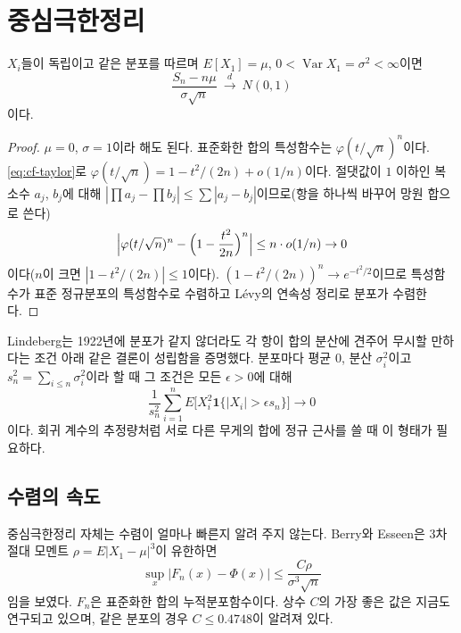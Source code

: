 \section{중심극한정리}
\label{sec:clt}

\begin{theorem}
\label{thm:clt}
$X_i$들이 독립이고 같은 분포를 따르며 $E[X_1]=\mu$, $0<\operatorname{Var}X_1=\sigma^2<\infty$이면
\[
\frac{S_n-n\mu}{\sigma\sqrt n}\ \xrightarrow{\ d\ }\ N(0,1)
\]
이다.
\end{theorem}

\begin{proof}
$\mu=0$, $\sigma=1$이라 해도 된다. 표준화한 합의 특성함수는 $\varphi(t/\sqrt n)^n$이다. \eqref{eq:cf-taylor}로 $\varphi(t/\sqrt n)=1-t^2/(2n)+o(1/n)$이다. 절댓값이 $1$ 이하인 복소수 $a_j$, $b_j$에 대해 $|\prod a_j-\prod b_j|\le\sum|a_j-b_j|$이므로(항을 하나씩 바꾸어 망원 합으로 쓴다)
\[
\Bigl|\varphi(t/\sqrt n)^n-\Bigl(1-\frac{t^2}{2n}\Bigr)^n\Bigr|\le n\cdot o(1/n)\to0
\]
이다($n$이 크면 $|1-t^2/(2n)|\le1$이다). $(1-t^2/(2n))^n\to e^{-t^2/2}$이므로 특성함수가 표준 정규분포의 특성함수로 수렴하고 Lévy의 연속성 정리로 분포가 수렴한다.
\end{proof}

Lindeberg는 1922년에 분포가 같지 않더라도 각 항이 합의 분산에 견주어 무시할 만하다는 조건 아래 같은 결론이 성립함을 증명했다\cite{lindeberg1922}. 분포마다 평균 $0$, 분산 $\sigma_i^2$이고 $s_n^2=\sum_{i\le n}\sigma_i^2$이라 할 때 그 조건은 모든 $\epsilon>0$에 대해
\[
\frac1{s_n^2}\sum_{i=1}^nE\bigl[X_i^2\mathbf 1\{|X_i|>\epsilon s_n\}\bigr]\to0
\]
이다. 회귀 계수의 추정량처럼 서로 다른 무게의 합에 정규 근사를 쓸 때 이 형태가 필요하다.

\subsection{수렴의 속도}

중심극한정리 자체는 수렴이 얼마나 빠른지 알려 주지 않는다. Berry\cite{berry1941}와 Esseen은 3차 절대 모멘트 $\rho=E|X_1-\mu|^3$이 유한하면
\[
\sup_x\bigl|F_n(x)-\Phi(x)\bigr|\le\frac{C\rho}{\sigma^3\sqrt n}
\]
임을 보였다. $F_n$은 표준화한 합의 누적분포함수이다. 상수 $C$의 가장 좋은 값은 지금도 연구되고 있으며, 같은 분포의 경우 $C\le0.4748$이 알려져 있다\cite{shevtsova2011}.


